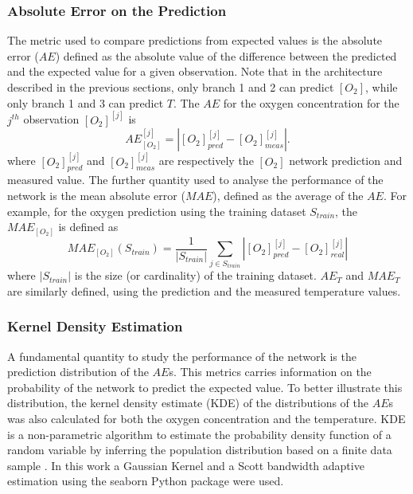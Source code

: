 \documentclass[final,5p,times,twocolumn]{elsarticle}
\begin{document}
\subsubsection{Absolute Error on the Prediction}

The metric used to compare predictions from expected values is the absolute error ($AE$) defined as the absolute value of the difference between the predicted and the expected value for a given observation. Note that in the architecture described in the previous sections, only branch 1 and 2 can predict $[O_2]$, 
while only branch 1 and 3 can predict $T$. The $AE$ for the oxygen concentration for the $j^{th}$ observation $[O_2]^{[j]}$  is 
\begin{equation}
\label{AE}
AE^{{[j]}}_{[O_2]} = |[O_2]^{{[j]}}_{pred}-[O_2]^{[j]}_{meas}|.
\end{equation}
where $[O_2]^{{[j]}}_{pred}$ and $[O_2]^{{[j]}}_{meas}$ are respectively the $[O_2]$ network prediction and measured value.
The further quantity used to analyse the performance of the network is the mean absolute error ($MAE$), defined as the average of the $AE$. For example, for the oxygen prediction using the training dataset $S_{train}$, the $MAE_{[O_2]}$ is defined as 
\begin{equation}
\label{MAE}
MAE_{[O_2]}(S_{train}) = \frac{1}{|S_{train}|} \sum_{j \in S_{train}}|[O_2]_{pred}^{[j]}-[O_2]_{real}^{[j]}|
\end{equation}
where $|S_{train}|$ is the size (or cardinality) of the training dataset. 
$AE_{T}$ and $MAE_T$ are similarly defined, using the prediction and the measured temperature values.

\subsubsection{Kernel Density Estimation}

A fundamental quantity to study the performance of the network is the prediction distribution of the $AE$s. This metrics carries information on the probability of the network to predict the expected value. To better illustrate this distribution, the kernel density estimate (KDE) of the distributions of the $AE$s was also calculated for both the oxygen concentration and the temperature. KDE is a non-parametric algorithm to estimate the probability density function of a random variable by inferring the population distribution based on a finite data sample \cite{Hastie2009}.  In this work a Gaussian Kernel and a Scott bandwidth adaptive estimation \cite{Sain1996} using the seaborn Python package \cite{Waskom2020} were used.
\end{document}

